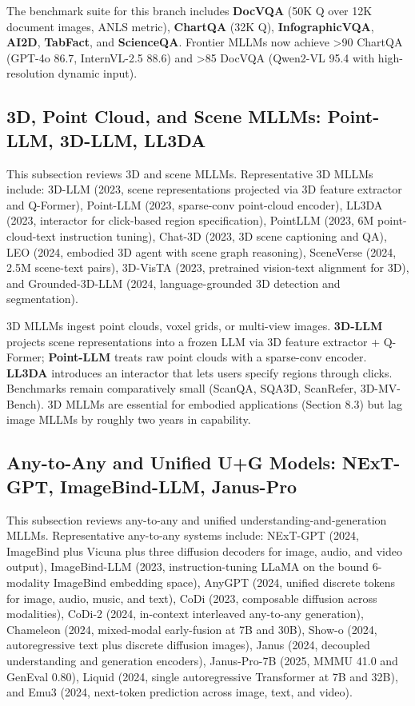 The benchmark suite for this branch includes \textbf{DocVQA} (50K Q over 12K document images, ANLS metric), \textbf{ChartQA} (32K Q), \textbf{InfographicVQA}, \textbf{AI2D}, \textbf{TabFact}, and \textbf{ScienceQA}. Frontier MLLMs now achieve \textgreater90 ChartQA (GPT-4o 86.7, InternVL-2.5 88.6) and \textgreater85 DocVQA (Qwen2-VL 95.4 with high-resolution dynamic input).

\subsection{3D, Point Cloud, and Scene MLLMs: Point-LLM, 3D-LLM, LL3DA}\label{d-point-cloud-and-scene-mllms-point-llm-3d-llm-ll3da}

This subsection reviews 3D and scene MLLMs. Representative 3D MLLMs include: 3D-LLM (2023, scene representations projected via 3D feature extractor and Q-Former), Point-LLM (2023, sparse-conv point-cloud encoder), LL3DA (2023, interactor for click-based region specification), PointLLM (2023, 6M point-cloud-text instruction tuning), Chat-3D (2023, 3D scene captioning and QA), LEO (2024, embodied 3D agent with scene graph reasoning), SceneVerse (2024, 2.5M scene-text pairs), 3D-VisTA (2023, pretrained vision-text alignment for 3D), and Grounded-3D-LLM (2024, language-grounded 3D detection and segmentation).

3D MLLMs ingest point clouds, voxel grids, or multi-view images. \textbf{3D-LLM} projects scene representations into a frozen LLM via 3D feature extractor + Q-Former; \textbf{Point-LLM} treats raw point clouds with a sparse-conv encoder. \textbf{LL3DA} introduces an interactor that lets users specify regions through clicks. Benchmarks remain comparatively small (ScanQA, SQA3D, ScanRefer, 3D-MV-Bench). 3D MLLMs are essential for embodied applications (Section 8.3) but lag image MLLMs by roughly two years in capability.

\subsection{Any-to-Any and Unified U+G Models: NExT-GPT, ImageBind-LLM, Janus-Pro}\label{any-to-any-and-unified-ug-models-next-gpt-imagebind-llm-janus-pro}

This subsection reviews any-to-any and unified understanding-and-generation MLLMs. Representative any-to-any systems include: NExT-GPT (2024, ImageBind plus Vicuna plus three diffusion decoders for image, audio, and video output), ImageBind-LLM (2023, instruction-tuning LLaMA on the bound 6-modality ImageBind embedding space), AnyGPT (2024, unified discrete tokens for image, audio, music, and text), CoDi (2023, composable diffusion across modalities), CoDi-2 (2024, in-context interleaved any-to-any generation), Chameleon (2024, mixed-modal early-fusion at 7B and 30B), Show-o (2024, autoregressive text plus discrete diffusion images), Janus (2024, decoupled understanding and generation encoders), Janus-Pro-7B (2025, MMMU 41.0 and GenEval 0.80), Liquid (2024, single autoregressive Transformer at 7B and 32B), and Emu3 (2024, next-token prediction across image, text, and video).

